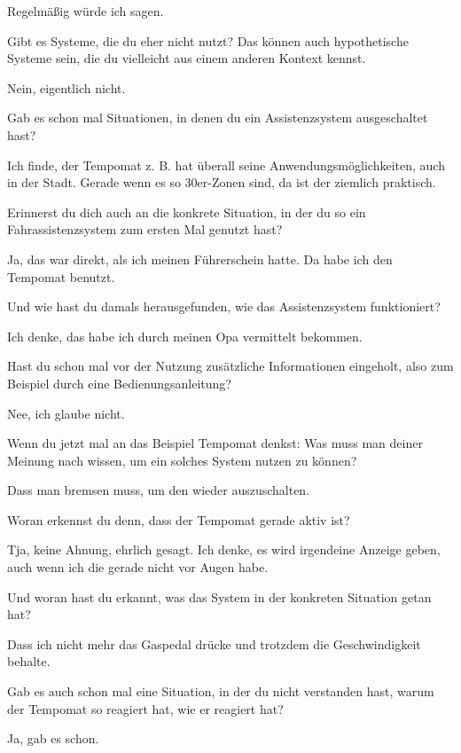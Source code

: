 Regelmäßig würde ich sagen.

\interviewerin
Gibt es Systeme, die du eher nicht nutzt? Das können auch hypothetische
Systeme sein, die du vielleicht aus einem anderen Kontext kennst.

Nein, eigentlich nicht.

\interviewerin
Gab es schon mal Situationen, in denen du ein Assistenzsystem
ausgeschaltet hast?

Ich finde, der Tempomat z. B. hat überall seine Anwendungsmöglichkeiten,
auch in der Stadt. Gerade wenn es so 30er-Zonen sind, da ist der
ziemlich praktisch.

\interviewerin
Erinnerst du dich auch an die konkrete Situation, in der du so ein
Fahrassistenzsystem zum ersten Mal genutzt hast?

Ja, das war direkt, als ich meinen Führerschein hatte. Da habe ich den
Tempomat benutzt.

\interviewerin
Und wie hast du damals herausgefunden, wie das Assistenzsystem
funktioniert?

Ich denke, das habe ich durch meinen Opa vermittelt bekommen.

\interviewerin
Hast du schon mal vor der Nutzung zusätzliche Informationen eingeholt,
also zum Beispiel durch eine Bedienungsanleitung?

Nee, ich glaube nicht.

\interviewerin
Wenn du jetzt mal an das Beispiel Tempomat denkst: Was muss man deiner
Meinung nach wissen, um ein solches System nutzen zu können?

Dass man bremsen muss, um den wieder auszuschalten.

\interviewerin
Woran erkennst du denn, dass der Tempomat gerade aktiv ist?

Tja, keine Ahnung, ehrlich gesagt. Ich denke, es wird irgendeine Anzeige
geben, auch wenn ich die gerade nicht vor Augen habe.

\interviewerin
Und woran hast du erkannt, was das System in der konkreten Situation
getan hat?

Dass ich nicht mehr das Gaspedal drücke und trotzdem die Geschwindigkeit
behalte.

\interviewerin
Gab es auch schon mal eine Situation, in der du nicht verstanden hast,
warum der Tempomat so reagiert hat, wie er reagiert hat?

Ja, gab es schon.

